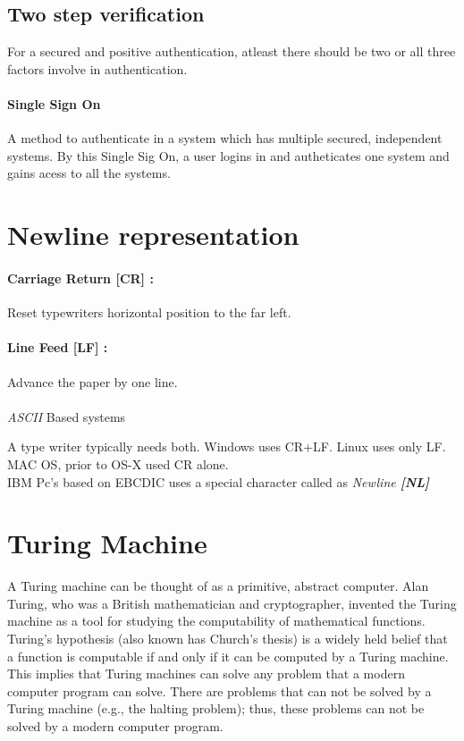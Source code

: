 \documentclass[12pt]{article}
\begin{document}
\subsection{Two step verification}
For a secured and positive authentication, atleast there should be two or all three factors involve in authentication.
\paragraph{Single Sign On} A method to authenticate in a system which has multiple secured, independent systems. By this Single Sig On, a user logins in and autheticates one system and gains acess to all the systems.
\pagebreak

%
%
\section{Newline representation}

\paragraph{Carriage Return [CR] : } Reset typewriters horizontal position to the far left.
\paragraph{Line Feed [LF] : } Advance the paper by one line.
\\
\\
\textit{ASCII }Based systems 

A type writer typically needs both.
Windows uses CR+LF.
Linux uses only LF.
MAC OS, prior to OS-X used CR alone.
\\

IBM Pc's based on EBCDIC uses a special character called as \textit{Newline \textbf{[NL]}}
\pagebreak



%
%
\section{Turing Machine}

A Turing machine can be thought of as a primitive, abstract computer. Alan Turing, who was a British mathematician and cryptographer, invented the Turing machine as a tool for studying the computability of mathematical functions. Turing's hypothesis (also known has Church's thesis) is a widely held belief that a function is computable if and only if it can be computed by a Turing machine. This implies that Turing machines can solve any problem that a modern computer program can solve. There are problems that can not be solved by a Turing machine (e.g., the halting problem); thus, these problems can not be solved by a modern computer program.
\end{document}
